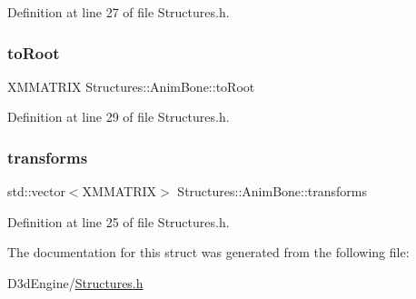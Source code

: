 Definition at line 27 of file Structures.\+h.

\mbox{\label{struct_structures_1_1_anim_bone_a029088abf71c971fda76aea1bd304a32}} 
\subsubsection{\texorpdfstring{to\+Root}{toRoot}}
{\footnotesize\ttfamily X\+M\+M\+A\+T\+R\+IX Structures\+::\+Anim\+Bone\+::to\+Root}



Definition at line 29 of file Structures.\+h.

\mbox{\label{struct_structures_1_1_anim_bone_aa2cec56089e60aad7d8c6e334146a6aa}} 
\subsubsection{\texorpdfstring{transforms}{transforms}}
{\footnotesize\ttfamily std\+::vector$<$X\+M\+M\+A\+T\+R\+IX$>$ Structures\+::\+Anim\+Bone\+::transforms}



Definition at line 25 of file Structures.\+h.



The documentation for this struct was generated from the following file\+:\begin{DoxyCompactItemize}
\item 
D3d\+Engine/\mbox{\hyperlink{_structures_8h}{Structures.\+h}}\end{DoxyCompactItemize}

